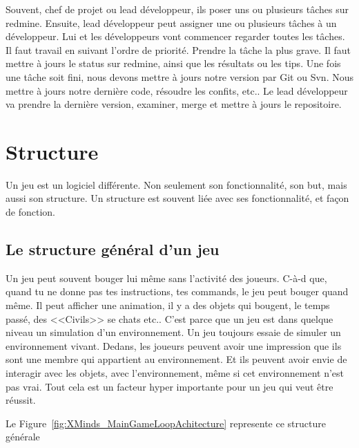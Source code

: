 Souvent, chef de projet ou lead développeur, ils poser uns ou plusieurs tâches sur redmine. Ensuite, lead développeur peut assigner une ou plusieurs tâches à un développeur. Lui et les développeurs vont commencer regarder toutes les tâches. Il faut travail en suivant l'ordre de priorité. Prendre la tâche la plus grave. Il faut mettre à jours le status sur redmine, ainsi que les résultats ou les tips. Une fois une tâche soit fini, nous devons mettre à jours notre version par Git ou Svn. Nous mettre à jours notre dernière code, résoudre les confits, etc.. Le lead développeur va prendre la dernière version, examiner, merge et mettre à jours le repositoire.




\section{Structure} %
\label{sec:structure}

Un jeu est un logiciel différente. Non seulement son fonctionnalité, son but, mais aussi son structure. Un structure est souvent liée avec ses fonctionnalité, et façon de fonction. 

\subsection{Le structure général d'un jeu} %
\label{sub:le_structure_général_d_un_jeu}

Un jeu peut souvent bouger lui même sans l'activité des joueurs. C-à-d que, quand tu ne donne pas tes instructions, tes commands, le jeu peut bouger quand même. Il peut afficher une animation, il y a des objets qui bougent, le temps passé, des <<Civils>> se chats etc.. C'est parce que un jeu est dans quelque niveau un simulation d'un environnement. Un jeu toujours essaie de simuler un environnement vivant. Dedans, les joueurs peuvent avoir une impression que ils sont une membre qui appartient au environnement. Et ils peuvent avoir envie de interagir avec les objets, avec l'environnement, même si cet environnement n'est pas vrai. Tout cela est un facteur hyper importante pour un jeu qui veut être réussit.

Le Figure~\ref{fig:XMinds_MainGameLoopAchitecture} represente ce structure générale


